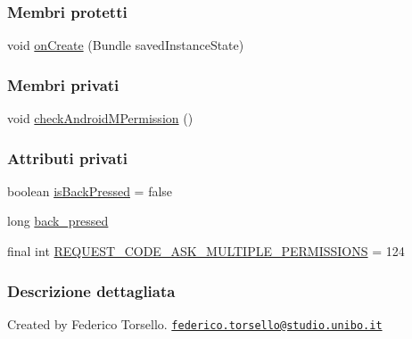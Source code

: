 \subsubsection*{Membri protetti}
\begin{DoxyCompactItemize}
\item 
void \hyperlink{classit_1_1unibo_1_1torsello_1_1bluetoothpositioning_1_1activities_1_1MainActivity_a8ffa5fa91fb4ae13a758a12682872a79_a8ffa5fa91fb4ae13a758a12682872a79}{on\+Create} (Bundle saved\+Instance\+State)
\end{DoxyCompactItemize}
\subsubsection*{Membri privati}
\begin{DoxyCompactItemize}
\item 
void \hyperlink{classit_1_1unibo_1_1torsello_1_1bluetoothpositioning_1_1activities_1_1MainActivity_ab762aac3d11f5b0ccc6042a140804d5d_ab762aac3d11f5b0ccc6042a140804d5d}{check\+Android\+M\+Permission} ()
\end{DoxyCompactItemize}
\subsubsection*{Attributi privati}
\begin{DoxyCompactItemize}
\item 
boolean \hyperlink{classit_1_1unibo_1_1torsello_1_1bluetoothpositioning_1_1activities_1_1MainActivity_a73d74411ec7bb55eb827bb81018174bd_a73d74411ec7bb55eb827bb81018174bd}{is\+Back\+Pressed} = false
\item 
long \hyperlink{classit_1_1unibo_1_1torsello_1_1bluetoothpositioning_1_1activities_1_1MainActivity_a5e1ae38b2bbdcc45f2164fdc393ca495_a5e1ae38b2bbdcc45f2164fdc393ca495}{back\+\_\+pressed}
\item 
final int \hyperlink{classit_1_1unibo_1_1torsello_1_1bluetoothpositioning_1_1activities_1_1MainActivity_a319aed5cdd5724e043302babe5fcfeac_a319aed5cdd5724e043302babe5fcfeac}{R\+E\+Q\+U\+E\+S\+T\+\_\+\+C\+O\+D\+E\+\_\+\+A\+S\+K\+\_\+\+M\+U\+L\+T\+I\+P\+L\+E\+\_\+\+P\+E\+R\+M\+I\+S\+S\+I\+O\+NS} = 124
\end{DoxyCompactItemize}


\subsubsection{Descrizione dettagliata}
Created by Federico Torsello. \href{mailto:federico.torsello@studio.unibo.it}{\tt federico.\+torsello@studio.\+unibo.\+it} 

